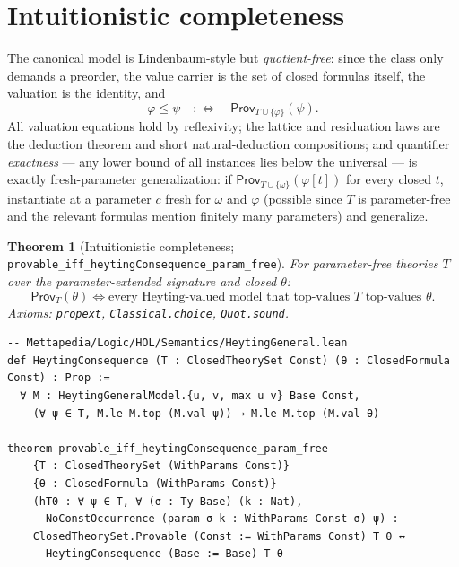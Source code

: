 \documentclass[11pt]{article}
\newcommand{\code}[1]{\texttt{#1}}
\newcommand{\Prov}{\mathsf{Prov}}
\theoremstyle{plain}
\newtheorem{theorem}{Theorem}[section]
\theoremstyle{definition}
\begin{document}
\section{Intuitionistic completeness}\label{sec:intuitionistic}

The canonical model is Lindenbaum-style but \emph{quotient-free}: since the
class only demands a preorder, the value carrier is the set of closed
formulas itself, the valuation is the identity, and
\[
  \varphi \le \psi \quad:\Longleftrightarrow\quad
  \Prov_{T\cup\{\varphi\}}(\psi).
\]
All valuation equations hold by reflexivity; the lattice and residuation laws
are the deduction theorem and short natural-deduction compositions; and
quantifier \emph{exactness} --- any lower bound of all instances lies below
the universal --- is exactly fresh-parameter generalization: if
$\Prov_{T\cup\{\omega\}}(\varphi[t])$ for every closed $t$, instantiate at a
parameter $c$ fresh for $\omega$ and $\varphi$ (possible since $T$ is
parameter-free and the relevant formulas mention finitely many parameters)
and generalize.

\begin{theorem}[Intuitionistic completeness;
\code{provable\_iff\_heytingConsequence\_param\_free}]
For parameter-free theories $T$ over the parameter-extended signature and
closed $\theta$:
\[
  \Prov_T(\theta)
  \iff
  \text{every Heyting-valued model that top-values $T$ top-values }\theta.
\]
Axioms: \code{propext}, \code{Classical.choice}, \code{Quot.sound}.
\end{theorem}

\begin{lstlisting}
-- Mettapedia/Logic/HOL/Semantics/HeytingGeneral.lean
def HeytingConsequence (T : ClosedTheorySet Const) (θ : ClosedFormula Const) : Prop :=
  ∀ M : HeytingGeneralModel.{u, v, max u v} Base Const,
    (∀ ψ ∈ T, M.le M.top (M.val ψ)) → M.le M.top (M.val θ)

theorem provable_iff_heytingConsequence_param_free
    {T : ClosedTheorySet (WithParams Const)}
    {θ : ClosedFormula (WithParams Const)}
    (hT0 : ∀ ψ ∈ T, ∀ (σ : Ty Base) (k : Nat),
      NoConstOccurrence (param σ k : WithParams Const σ) ψ) :
    ClosedTheorySet.Provable (Const := WithParams Const) T θ ↔
      HeytingConsequence (Base := Base) T θ
\end{lstlisting}
\end{document}
